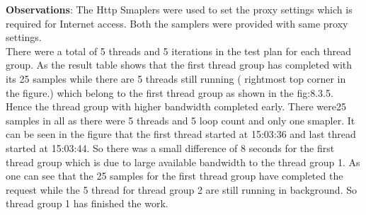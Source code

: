 \documentclass[12pt]{book}
\begin{document}
  \textbf{Observations}: The Http Smaplers were used to set the proxy settings which is required for Internet access. Both
  the samplers were provided with same proxy settings.\\
  There were a total of 5 threads and 5 iterations in the test plan for each thread group. As the
  result table shows that the first thread group has completed with its 25 samples while there are 5
  threads still running ( rightmost top corner in the figure.) which belong to the first thread group
  as shown in the fig:8.3.5. Hence the thread group with higher bandwidth completed early. There
  were25 samples in all as there were 5 threads and 5 loop count and only one smapler. It can be
  seen in the figure that the first thread started at 15:03:36 and last thread started at 15:03:44. So
  there was a small difference of 8 seconds for the first thread group which is due to large available
  bandwidth to the thread group 1. As one can see that the 25 samples for the first thread group
  have completed the request while the 5 thread for thread group 2 are still running in background.
  So thread group 1 has finished the work.\\
\end{document}
